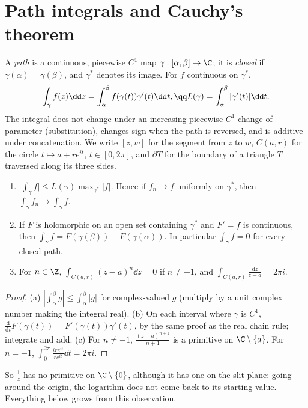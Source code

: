 \section{Path integrals and Cauchy's theorem}

A \emph{path} is a continuous, piecewise $C^1$ map $\gamma:[\alpha,\beta]\to\C$; it is \emph{closed} if $\gamma(\alpha)=\gamma(\beta)$, and $\gamma^*$ denotes its
image. For $f$ continuous on $\gamma^*$,
\[
\begin{gathered}\int_\gamma f(z)\dd z=\int_\alpha^\beta f(\gamma(t))\gamma'(t)\dd t,\qq L(\gamma)=\int_\alpha^\beta|\gamma'(t)|\dd t.\end{gathered}
\]
The integral does not change under an increasing piecewise $C^1$ change of parameter (substitution), changes sign when the
path is reversed, and is additive under concatenation. We write $[z,w]$ for the segment from $z$ to $w$, $C(a,r)$ for the
circle $t\mapsto a+re^{it}$, $t\in[0,2\pi]$, and $\partial T$ for the boundary of a triangle $T$ traversed along its three sides.

\begin{proposition}\label{prop:pathint}
\begin{enumerate}[label=(\alph*)]
\item $\bigl|\int_\gamma f\bigr|\le L(\gamma)\max_{\gamma^*}|f|$. Hence if $f_n\to f$ uniformly on $\gamma^*$, then $\int_\gamma f_n\to\int_\gamma f$.
\item If $F$ is holomorphic on an open set containing $\gamma^*$ and $F'=f$ is continuous, then $\int_\gamma f=F(\gamma(\beta))-F(\gamma(\alpha))$. In
particular $\int_\gamma f=0$ for every closed path.
\item For $n\in\Z$, $\displaystyle\int_{C(a,r)}(z-a)^n\dd z=0$ if $n\ne-1$, and $\displaystyle\int_{C(a,r)}\frac{\mathrm dz}{z-a}=2\pi i$.
\end{enumerate}
\end{proposition}
\begin{proof}
(a) $|\int_\alpha^\beta g|\le\int_\alpha^\beta|g|$ for complex-valued $g$ (multiply by a unit complex number making the integral real). (b) On
each interval where $\gamma$ is $C^1$, $\frac{\mathrm d}{\mathrm dt}F(\gamma(t))=F'(\gamma(t))\gamma'(t)$, by the same proof as the real chain rule; integrate
and add. (c) For $n\ne-1$, $\frac{(z-a)^{n+1}}{n+1}$ is a primitive on $\C\setminus\{a\}$. For $n=-1$, $\int_0^{2\pi}\frac{ire^{it}}{re^{it}}\dd t=2\pi i$.
\end{proof}

So $\frac1z$ has no primitive on $\C\setminus\{0\}$, although it has one on the slit plane: going around the origin, the logarithm
does not come back to its starting value. Everything below grows from this observation.

